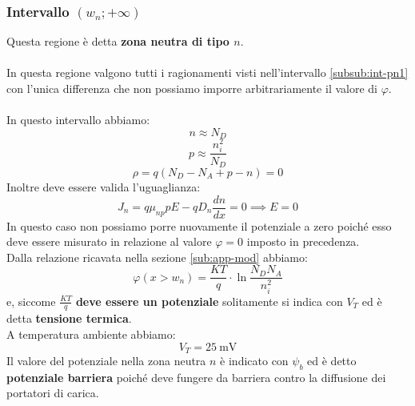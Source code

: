 \documentclass{article}
\numberwithin{equation}{subsection}
\begin{document}
	\subsubsection{Intervallo $(w_n; +\infty)$}
	\label{subsub:int-pn5}
	Questa regione è detta \textbf{zona neutra di tipo $n$}.\\\\
	In questa regione valgono tutti i ragionamenti visti nell'intervallo \ref{subsub:int-pn1} con l’unica differenza che non possiamo imporre arbitrariamente il valore di $\varphi$.\\\\
	In questo intervallo abbiamo:
	$$n\approx N_D$$
	$$p\approx\frac{n_i^2}{N_D}$$
	$$\rho=q\left(N_D-N_A+p-n\right)=0$$
	Inoltre deve essere valida l’uguaglianza:
	$$J_n=q\mu_{np}pE-qD_n\frac{dn}{dx}=0\implies E=0$$
	In questo caso non possiamo porre nuovamente il potenziale a zero poiché esso deve essere misurato in relazione al valore $\varphi=0$ imposto in precedenza. \\
	Dalla relazione ricavata nella sezione \ref{sub:app-mod} abbiamo:
	$$\varphi\left(x>w_n\right)=\frac{KT}{q}\cdot\ln\frac{N_D N_A}{n_i^2}$$
	e, siccome $\frac{KT}{q}$ \textbf{deve essere un potenziale} solitamente si indica con $V_T$ ed è detta \textbf{tensione termica}.\\
	A temperatura ambiente abbiamo:
	$$V_T=25 \ \mathrm{mV}$$
	Il valore del potenziale nella zona neutra $n$ è indicato con $\psi_b$ ed è detto \textbf{potenziale barriera} poiché deve fungere da barriera contro la diffusione dei portatori di carica.
\end{document}
